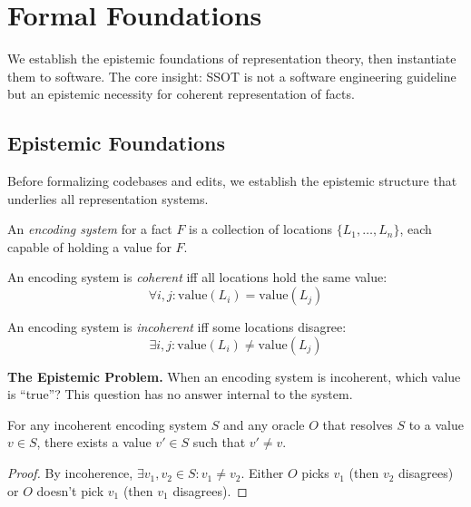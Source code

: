 \section{Formal Foundations}\label{sec:foundations}

We establish the epistemic foundations of representation theory, then instantiate them to software. The core insight: SSOT is not a software engineering guideline but an epistemic necessity for coherent representation of facts.

\subsection{Epistemic Foundations}\label{sec:epistemic}

Before formalizing codebases and edits, we establish the epistemic structure that underlies all representation systems.

\begin{definition}\label{def:encoding-system}
An \emph{encoding system} for a fact $F$ is a collection of locations $\{L_1, \ldots, L_n\}$, each capable of holding a value for $F$.
\end{definition}

\begin{definition}[Coherence]\label{def:coherence}
An encoding system is \emph{coherent} iff all locations hold the same value:
\[
\forall i, j: \text{value}(L_i) = \text{value}(L_j)
\]
\end{definition}

\begin{definition}[Incoherence]\label{def:incoherence}
An encoding system is \emph{incoherent} iff some locations disagree:
\[
\exists i, j: \text{value}(L_i) \neq \text{value}(L_j)
\]
\end{definition}

\textbf{The Epistemic Problem.} When an encoding system is incoherent, which value is ``true''? This question has no answer internal to the system.

\begin{theorem}\label{thm:oracle-arbitrary}
For any incoherent encoding system $S$ and any oracle $O$ that resolves $S$ to a value $v \in S$, there exists a value $v' \in S$ such that $v' \neq v$.
\end{theorem}

\begin{proof}
By incoherence, $\exists v_1, v_2 \in S: v_1 \neq v_2$. Either $O$ picks $v_1$ (then $v_2$ disagrees) or $O$ doesn't pick $v_1$ (then $v_1$ disagrees).
\end{proof}

